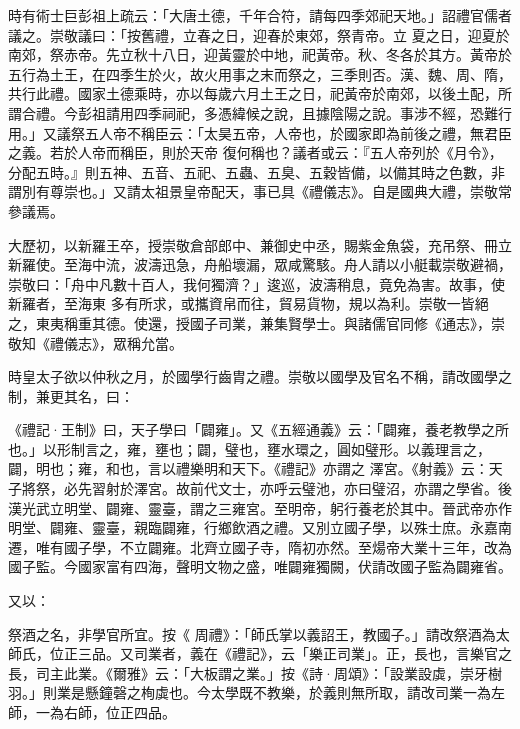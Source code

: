 \begin{pinyinscope}
 時有術士巨彭祖上疏云：「大唐土德，千年合符，請每四季郊祀天地。」詔禮官儒者議之。崇敬議曰：「按舊禮，立春之日，迎春於東郊，祭青帝。立
 夏之日，迎夏於南郊，祭赤帝。先立秋十八日，迎黃靈於中地，祀黃帝。秋、冬各於其方。黃帝於五行為土王，在四季生於火，故火用事之末而祭之，三季則否。漢、魏、周、隋，共行此禮。國家土德乘時，亦以每歲六月土王之日，祀黃帝於南郊，以後土配，所謂合禮。今彭祖請用四季祠祀，多憑緯候之說，且據陰陽之說。事涉不經，恐難行用。」又議祭五人帝不稱臣云：「太昊五帝，人帝也，於國家即為前後之禮，無君臣之義。若於人帝而稱臣，則於天帝
 復何稱也？議者或云：『五人帝列於《月令》，分配五時。』則五神、五音、五祀、五蟲、五臭、五穀皆備，以備其時之色數，非謂別有尊崇也。」又請太祖景皇帝配天，事已具《禮儀志》。自是國典大禮，崇敬常參議焉。



 大歷初，以新羅王卒，授崇敬倉部郎中、兼御史中丞，賜紫金魚袋，充吊祭、冊立新羅使。至海中流，波濤迅急，舟船壞漏，眾咸驚駭。舟人請以小艇載崇敬避禍，崇敬曰：「舟中凡數十百人，我何獨濟？」逡巡，波濤稍息，竟免為害。故事，使新羅者，至海東
 多有所求，或攜資帛而往，貿易貨物，規以為利。崇敬一皆絕之，東夷稱重其德。使還，授國子司業，兼集賢學士。與諸儒官同修《通志》，崇敬知《禮儀志》，眾稱允當。



 時皇太子欲以仲秋之月，於國學行齒胄之禮。崇敬以國學及官名不稱，請改國學之制，兼更其名，曰：



 《禮記·王制》曰，天子學曰「闢雍」。又《五經通義》云：「闢雍，養老教學之所也。」以形制言之，雍，壅也；闢，璧也，壅水環之，圓如璧形。以義理言之，闢，明也；雍，和也，言以禮樂明和天下。《禮記》亦謂之
 澤宮。《射義》云：天子將祭，必先習射於澤宮。故前代文士，亦呼云璧池，亦曰璧沼，亦謂之學省。後漢光武立明堂、闢雍、靈臺，謂之三雍宮。至明帝，躬行養老於其中。晉武帝亦作明堂、闢雍、靈臺，親臨闢雍，行鄉飲酒之禮。又別立國子學，以殊士庶。永嘉南遷，唯有國子學，不立闢雍。北齊立國子寺，隋初亦然。至煬帝大業十三年，改為國子監。今國家富有四海，聲明文物之盛，唯闢雍獨闕，伏請改國子監為闢雍省。



 又以：



 祭酒之名，非學官所宜。按《
 周禮》：「師氏掌以義詔王，教國子。」請改祭酒為太師氏，位正三品。又司業者，義在《禮記》，云「樂正司業」。正，長也，言樂官之長，司主此業。《爾雅》云：「大板謂之業。」按《詩·周頌》：「設業設虡，崇牙樹羽。」則業是懸鐘磬之栒虡也。今太學既不教樂，於義則無所取，請改司業一為左師，一為右師，位正四品。




\end{pinyinscope}
